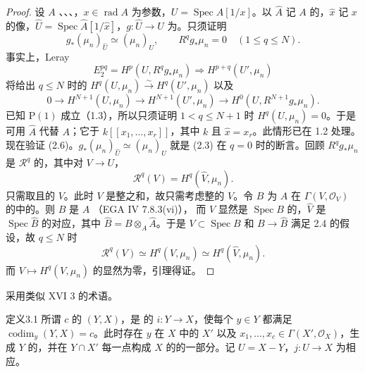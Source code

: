 \begin{proof}
设 $A$ 、、、，$x\in\operatorname{rad}A$ 为参数，$U=\operatorname{Spec}A[1/x]$。以 $\widehat A$ 记 $A$ 的，$\widehat x$ 记 $x$ 的像，$\widehat U=\operatorname{Spec}\widehat A[1/\widehat x]$，$g:\widehat U\to U$ 为。只须证明
\[g_*(\mu_n)_{\widehat U}\simeq(\mu_n)_U,\qquad R^qg_*\mu_n=0\quad(1\le q\le N).\tag{2.6}\]
事实上，Leray 
\[E_2^{pq}=H^p(U,R^qg_*\mu_n)\Longrightarrow H^{p+q}(U',\mu_n)\]
将给出 $q\le N$ 时的 $H^q(U,\mu_n)\xrightarrow{\sim}H^q(U',\mu_n)$ 以及
\[0\longrightarrow H^{N+1}(U,\mu_n)\longrightarrow H^{N+1}(U',\mu_n)\longrightarrow H^0(U,R^{N+1}g_*\mu_n).\]
已知 $\mathrm P(1)$ 成立（1.3），所以只须证明 $1<q\le N+1$ 时 $H^q(U,\mu_n)=0$。于是可用 $\widehat A$ 代替 $A$；它于 $k[[x_1,\ldots,x_r]]$，其中 $k$ 且 $\widehat x=x_r$。此情形已在 1.2 处理。
现在验证 (2.6)。$g_*(\mu_n)_{\widehat U}\simeq(\mu_n)_U$ 就是 (2.3) 在 $q=0$ 时的断言。回顾 $R^qg_*\mu_n$ 是 $\mathscr R^q$ 的，其中对 $V\to U$，
\[\mathscr R^q(V)=H^q(\widehat V,\mu_n).\]
只需取且的 $V$。此时 $V$ 是整之和，故只需考虑整的 $V$。令 $B$ 为 $A$ 在 $\Gamma(V,\mathcal O_V)$ 的中的。则 $B$ 是 $A$ （EGA IV 7.8.3(vi)），
而 $V$ 显然是 $\operatorname{Spec}B$ 的，$\widehat V$ 是 $\operatorname{Spec}\widehat B$ 的对应，其中 $\widehat B=B\otimes_A\widehat A$。于是 $V\subset\operatorname{Spec}B$ 和 $B\to\widehat B$ 满足 2.4 的假设，故 $q\le N$ 时
\[\mathscr R^q(V)\simeq H^q(V,\mu_n)\simeq H^q(\widehat V,\mu_n).\]
而 $V\mapsto H^q(V,\mu_n)$ 的显然为零，引理得证。
\end{proof}
采用类似 XVI 3 的术语。
\begin{SGAresult}{定义}{3.1}
所谓 $c$ 的 $(Y,X)$，是 的 $i:Y\to X$，使每个 $y\in Y$ 都满足 $\operatorname{codim}_y(Y,X)=c$。此时存在 $y$ 在 $X$ 中的 $X'$ 以及 $x_1,\ldots,x_c\in\Gamma(X',\mathcal O_X)$，生成 $Y$ 的，并在 $Y\cap X'$ 每一点构成 $X$ 的的一部分。记 $U=X-Y$，$j:U\to X$ 为相应。
\end{SGAresult}

